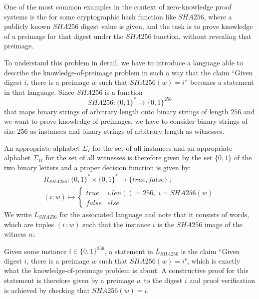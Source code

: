 \begin{example} One of the most common examples in the context of zero-knowledge proof systems is the  for some cryptographic hash function like $SHA256$, where a publicly known $SHA256$ digest value is given, and the task is to prove knowledge of a preimage for that digest under the $SHA256$ function, without revealing that preimage. 

To understand this problem in detail, we have to introduce a language able to describe the knowledge-of-preimage problem in such a way that the claim ``Given digest $i$, there is a preimage $w$ such that $SHA256(w)=i$'' becomes a statement in that language. Since $SHA256$ is a function
$$
SHA256: \{0,1\}^* \to \{0,1\}^{256}
$$
that maps binary strings of arbitrary length onto binary strings of length $256$ and we want to prove knowledge of preimages, we have to consider binary strings of size $256$ as instances and binary strings of arbitrary length as witnesses. 

An appropriate alphabet $\Sigma_I$ for the set of all instances and an appropriate alphabet $\Sigma_W$ for the set of all witnesses is therefore given by the set $\{0,1\}$ of the two binary letters and a proper decision function is given by:
\begin{multline*}
R_{SHA256} : \{0,1\}^* \times \{0,1\}^* \to \{true, false\}\;;\;\\
(i;w) \mapsto
\begin{cases}
true & i.len()=256,\; i = SHA256(w)\\
false & else
\end{cases}
\end{multline*}
We write $L_{SHA256}$ for the associated language and note that it consists of words, which are tuples $(i\,;w)$ such that the instance $i$ is the $SHA256$ image of the witness $w$. 

Given some instance $i\in \{0,1\}^{256}$, a statement in $L_{SHA256}$ is the claim ``Given digest $i$, there is a preimage $w$ such that $SHA256(w)=i$", which is exactly what the knowledge-of-preimage problem is about. A constructive proof for this statement is therefore given by a preimage $w$ to the digest $i$ and proof verification is achieved by checking that $SHA256(w)=i$. 
\end{example}
